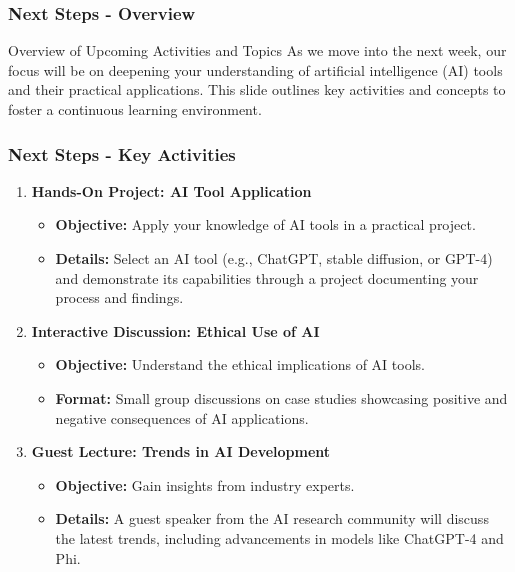 \documentclass[aspectratio=169]{beamer}
\begin{document}
\begin{frame}[fragile]
    \frametitle{Next Steps - Overview}
    \begin{block}{Overview of Upcoming Activities and Topics}
        As we move into the next week, our focus will be on deepening your understanding of artificial intelligence (AI) tools and their practical applications.
        This slide outlines key activities and concepts to foster a continuous learning environment.
    \end{block}
\end{frame}

\begin{frame}[fragile]
    \frametitle{Next Steps - Key Activities}
    \begin{enumerate}
        \item \textbf{Hands-On Project: AI Tool Application}
            \begin{itemize}
                \item \textbf{Objective:} Apply your knowledge of AI tools in a practical project.
                \item \textbf{Details:} Select an AI tool (e.g., ChatGPT, stable diffusion, or GPT-4) and demonstrate its capabilities through a project documenting your process and findings.
            \end{itemize}
        
        \item \textbf{Interactive Discussion: Ethical Use of AI}
            \begin{itemize}
                \item \textbf{Objective:} Understand the ethical implications of AI tools.
                \item \textbf{Format:} Small group discussions on case studies showcasing positive and negative consequences of AI applications.
            \end{itemize}

        \item \textbf{Guest Lecture: Trends in AI Development}
            \begin{itemize}
                \item \textbf{Objective:} Gain insights from industry experts.
                \item \textbf{Details:} A guest speaker from the AI research community will discuss the latest trends, including advancements in models like ChatGPT-4 and Phi.
            \end{itemize}
    \end{enumerate}
\end{frame}
\end{document}
